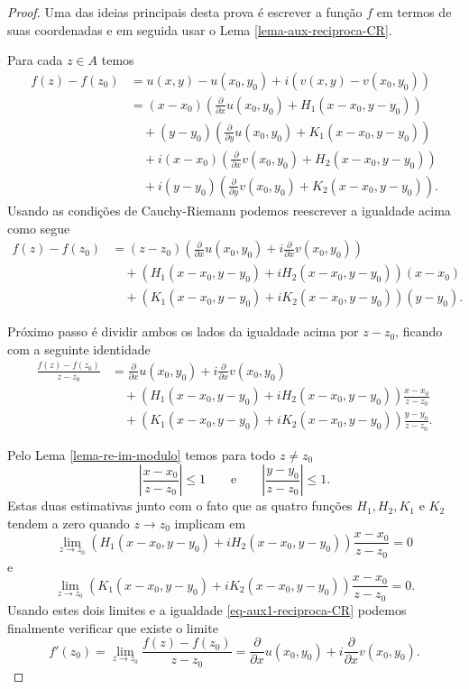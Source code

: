 \begin{proof}
Uma das ideias principais desta prova é escrever a função $f$ em termos de suas coordenadas e em
seguida usar o Lema \ref{lema-aux-reciproca-CR}. 

Para cada $z\in A$ temos 
\begin{align*}
f(z)-f(z_0)
&=
u(x,y)-u(x_0,y_0)+i(v(x,y)-v(x_0,y_0))
\\[0.3cm]
&=
(x-x_0)\left( \frac{\partial}{\partial x}u(x_0,y_0) +H_1(x-x_0,y-y_0)  \right)
\\
&\quad + 
(y-y_0)\left( \frac{\partial}{\partial y}u(x_0,y_0) +K_1(x-x_0,y-y_0)  \right)
\\
&\quad +
i (x-x_0)\left( \frac{\partial}{\partial x}v(x_0,y_0) +H_2(x-x_0,y-y_0)  \right)
\\
&\quad +
i (y-y_0)\left( \frac{\partial}{\partial y}v(x_0,y_0) +K_2(x-x_0,y-y_0)  \right).
\end{align*}
Usando as condições de Cauchy-Riemann podemos reescrever a igualdade acima como segue
\begin{align*}
f(z)-f(z_0)
&=
(z-z_0)\left(  \frac{\partial}{\partial x}u(x_0,y_0) +i \frac{\partial}{\partial x}v(x_0,y_0)   \right)
\\
&\quad +
(H_1(x-x_0,y-y_0) +i H_2(x-x_0,y-y_0)) (x-x_0)
\\
&\quad +
(K_1(x-x_0,y-y_0) +i K_2(x-x_0,y-y_0)) (y-y_0).
\end{align*}

Próximo passo é dividir ambos os lados da igualdade acima por $z-z_0$, ficando com a seguinte identidade
\begin{align}\label{eq-aux1-reciproca-CR}
\frac{f(z)-f(z_0)}{z-z_0}
&=
\frac{\partial}{\partial x}u(x_0,y_0) +i \frac{\partial}{\partial x}v(x_0,y_0) 
\nonumber\\
&\quad +
(H_1(x-x_0,y-y_0) +i H_2(x-x_0,y-y_0)) \frac{x-x_0}{z-z_0}
\nonumber\\
&\quad +
(K_1(x-x_0,y-y_0) +i K_2(x-x_0,y-y_0)) \frac{y-y_0}{z-z_0}.
\end{align}

Pelo Lema \ref{lema-re-im-modulo} temos para todo $z\neq z_0$
\[
\left| \frac{x-x_0}{z-z_0} \right|\leqslant 1
\qquad\text{e}\qquad 
\left| \frac{y-y_0}{z-z_0} \right|\leqslant 1.
\]
Estas duas estimativas junto com o fato que as quatro funções $H_1,H_2,K_1$ e $K_2$
tendem a zero quando $z\to z_0$ implicam em 
\[
\lim_{z\to z_0}
(H_1(x-x_0,y-y_0) +i H_2(x-x_0,y-y_0)) \frac{x-x_0}{z-z_0}
=
0
\]
e
\[
\lim_{z\to z_0}
(K_1(x-x_0,y-y_0) +i K_2(x-x_0,y-y_0)) \frac{x-x_0}{z-z_0}
=
0.
\]
Usando estes dois limites e a  igualdade \eqref{eq-aux1-reciproca-CR} podemos finalmente verificar que existe o limite
\[
f'(z_0)
=
\lim_{z\to z_0}\frac{f(z)-f(z_0)}{z-z_0}
=
\frac{\partial}{\partial x}u(x_0,y_0) +i \frac{\partial}{\partial x}v(x_0,y_0) .
\]
\end{proof}

